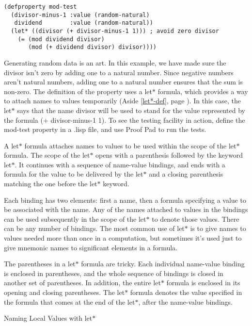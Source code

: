 \begin{Verbatim}
(defproperty mod-test
  (divisor-minus-1 :value (random-natural)
   dividend        :value (random-natural))
  (let* ((divisor (+ divisor-minus-1 1))) ; avoid zero divisor
    (= (mod dividend divisor)
       (mod (+ dividend divisor) divisor))))
\end{Verbatim}

Generating 
random data 
is an art.
In this example, we have made sure the divisor isn't zero
by adding one to a natural number.
Since negative numbers aren't natural numbers, adding one
to a natural number ensures that the sum is non-zero.
\label{let-example-brief-explain}
The definition of the property uses a
\textsf{let$*$} formula,
which provides a way to attach names to values temporarily
(Aside \ref{let*-def}, page \pageref{let*-def}).
In this case, the \textsf{let$*$} says that
the name \textsf{divisor} will be used to stand for
the value represented by the formula \textsf{(+ divisor-minus-1 1)}.
To see the testing facility in action,
define the mod-test property in a .lisp file,
and use Proof Pad to run the tests.

\begin{aside}
A \textsf{let$*$ }formula attaches names to values
to be used within the scope of the \textsf{let$*$} formula.
The scope of the \textsf{let$*$} opens with a parenthesis followed
by the keyword \textsf{let$*$}. It continues with
a sequence of name-value bindings, and ends with
a formula for the value to be delivered by the \textsf{let$*$}
and a closing parenthesis matching the one before
the \textsf{let$*$} keyword.

Each binding has two elements: first a name,
then a formula specifying a value to be associated with the name.
Any of the names attached to values in the bindings
can be used subsequently in the scope of the \textsf{let$*$ }to denote those values.
There can be any number of bindings.
The most common use of \textsf{let$*$} is to give names
to values needed more than once in a computation,
but sometimes it's used just to give mnemonic names
to significant elements in a formula.

The parentheses in a \textsf{let$*$} formula are tricky.
Each individual name-value binding is enclosed in parentheses,
and the whole sequence of bindings is closed in another set
of parentheses. In addition, the entire \textsf{let$*$} formula
is enclosed in its opening and closing parentheses.
The \textsf{let$*$ }formula denotes the value specified
in the formula that comes at the end of the 
\textsf{let$*$}, 
after the name-value bindings.
\caption{Naming Local Values with \textsf{let$*$}}
\label{let*-def}
\end{aside}

